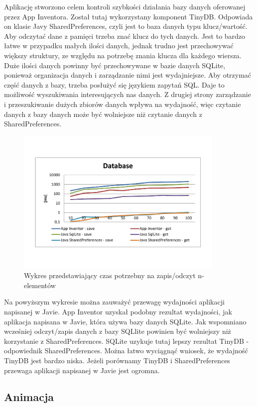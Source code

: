 Aplikację stworzono celem kontroli szybkości działania bazy danych oferowanej przez App Inventora. Został tutaj wykorzystany komponent TinyDB. Odpowiada on klasie Javy SharedPreferences, czyli jest to baza danych typu klucz/wartość. Aby odczytać dane z pamięci trzeba znać klucz do tych danych. Jest to bardzo łatwe w przypadku małych ilości danych, jednak trudno jest przechowywać większy struktury, ze względu na potrzebę znania klucza dla każdego wiersza. Duże ilości danych powinny być przechowywane w bazie danych SQLite, ponieważ organizacja danych i zarządzanie nimi jest wydajniejsze. Aby otrzymać część danych z bazy, trzeba posłużyć się językiem zapytań SQL. Daje to możliwość wyszukiwania interesujących nas danych. Z drugiej strony zarządzanie i przeszukiwanie dużych zbiorów danych wpływa na wydajność, więc czytanie danych z bazy danych może być wolniejsze niż czytanie danych z SharedPreferences.

\begin{figure}[H]
\centering\includegraphics[width=10cm]{figures/apps/databaseChart}
\caption{Wykres przedstawiający czas potrzebny na zapis/odczyt n-elementów}
\end{figure}

Na powyższym wykresie można zauważyć przewagę wydajności aplikacji napisanej w Javie. App Inventor uzyskał podobny rezultat wydajności, jak aplikacja napisana w Javie, która używa bazy danych SQLite. Jak wspomniano wcześniej odczyt/zapis danych z bazy SQLlite powinien być wolniejszy niż korzystanie z SharedPreferences. SQLite uzykuje tutaj lepszy rezultat TinyDB - odpowiednik SharedPreferences. Można łatwo wyciągnąć wniosek, że wydajność TinyDB jest bardzo niska. Jeżeli porównamy TinyDB i SharedPreferences przewaga aplikacji napisanej w Javie jest ogromna.


\subsection{Animacja}

